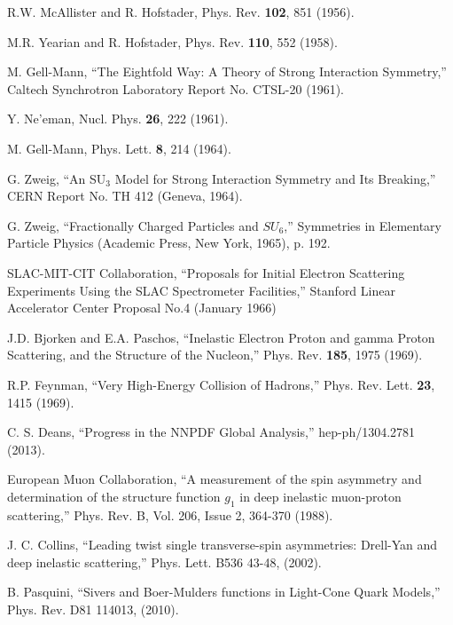 \begin{thebibliography}{99}

	R.W. McAllister and R. Hofstader,
	Phys. Rev. \textbf{102}, 851 (1956).

	M.R. Yearian and R. Hofstader,
	Phys. Rev. \textbf{110}, 552 (1958).

	M. Gell-Mann, ``The Eightfold Way: A Theory of Strong Interaction Symmetry,''
	Caltech Synchrotron Laboratory Report No. CTSL-20 (1961).

	Y. Ne'eman, 
	Nucl. Phys. \textbf{26}, 222 (1961).

	M. Gell-Mann,
	Phys. Lett. \textbf{8}, 214 (1964).

	G. Zweig, ``An SU$_{3}$ Model for Strong Interaction Symmetry and Its Breaking,''
	CERN Report No. TH 412 (Geneva, 1964).

	G. Zweig, ``Fractionally Charged Particles and $SU_{6}$,''
	Symmetries in Elementary Particle Physics (Academic Press, New York, 1965), p. 192.

	SLAC-MIT-CIT Collaboration, ``Proposals for Initial Electron Scattering Experiments Using the SLAC Spectrometer Facilities,''
	Stanford Linear Accelerator Center Proposal No.4 (January 1966)

	J.D. Bjorken and E.A. Paschos, ``Inelastic Electron Proton and gamma Proton Scattering, and the Structure of the Nucleon,''
	Phys. Rev. \textbf{185}, 1975 (1969).

	R.P. Feynman, ``Very High-Energy Collision of Hadrons,''
	Phys. Rev. Lett. \textbf{23}, 1415 (1969).

	C. S. Deans, ``Progress in the NNPDF Global Analysis,''
	hep-ph/1304.2781 (2013).

	European Muon Collaboration, ``A measurement of the spin asymmetry and determination of the structure function $g_1$ in deep inelastic muon-proton scattering,''
	Phys. Rev. B, Vol. 206, Issue 2, 364-370 (1988).

	J. C. Collins, ``Leading twist single transverse-spin asymmetries: Drell-Yan and deep inelastic scattering,''
	Phys. Lett. B536 43-48, (2002).

	B. Pasquini, ``Sivers and Boer-Mulders functions in Light-Cone Quark Models,''
	Phys. Rev. D81 114013, (2010).


\end{thebibliography}
